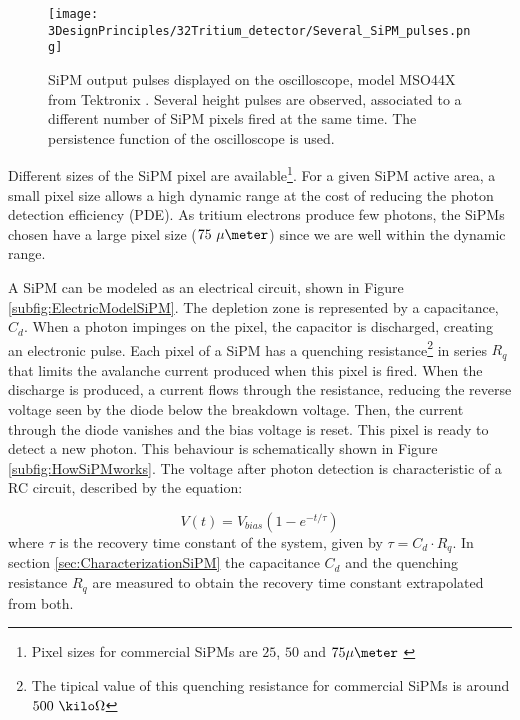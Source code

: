 \begin{figure}[h]
\centering
\texttt{[image: 3DesignPrinciples/32Tritium\_detector/Several\_SiPM\_pulses.png]}
\caption{SiPM output pulses displayed on the oscilloscope, model MSO44X from Tektronix \cite{Oscilloscope}. Several height pulses are observed, associated to a different number of  SiPM pixels fired at the same time. The persistence function of the oscilloscope is used.\label{fig:PulsesOfSiPM}}
\end{figure}

Different sizes of the SiPM pixel are available\footnote{Pixel sizes for commercial SiPMs are $25$, $50$ and $75\mu\meter$ \cite{DataSheetHammamatsu_1_SiPM_25, DataSheetHammamatsu_1_SiPM_50, DataSheetHammamatsu_1_SiPM_75}}. For a given SiPM active area, a small pixel size allows a high dynamic range at the cost of reducing the photon detection efficiency (PDE). As tritium electrons produce few photons, the SiPMs chosen have a large pixel size ($75~\mu\meter$) since we are well within the dynamic range.


A SiPM can be modeled as an electrical circuit, shown in Figure \ref{subfig:ElectricModelSiPM}. The depletion zone is represented by a capacitance, $C_d$. When a photon impinges on the pixel, the capacitor is discharged, creating an electronic pulse. Each pixel of a SiPM has a quenching resistance\footnote{The tipical value of this quenching resistance for commercial SiPMs is around $500~\kilo\Omega$} in series $R_q$ that limits the avalanche current produced when this pixel is fired. When the discharge is produced, a current flows through the resistance, reducing the reverse voltage seen by the diode below the breakdown voltage. Then, the current through the diode vanishes and the bias voltage is reset. This pixel is ready to detect a new photon. This behaviour is schematically shown in Figure \ref{subfig:HowSiPMworks}. The voltage after photon detection is characteristic of a RC circuit, described by the equation: 

\begin{equation}
V(t)=V_{bias}\left(1-e^{-t/\tau} \right)
\label{RCCircuitBiasVoltage}
\end{equation}
where $\tau$ is the recovery time constant of the system, given by $\tau=C_d \cdot{} R_q$. In section \ref{sec:CharacterizationSiPM} the capacitance $C_d$ and the quenching resistance $R_q$ are measured to obtain the recovery time constant extrapolated from both.


